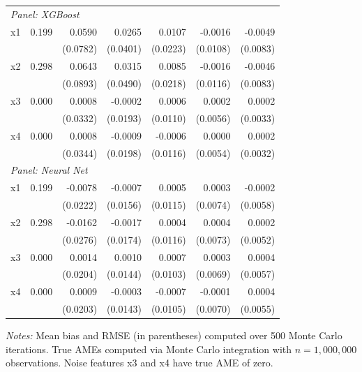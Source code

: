 \documentclass[12pt]{article}
\begin{document}
\begin{table}[htbp]
\begin{threeparttable}
\begin{tabular}{lrrrrrr}
				\multicolumn{7}{l}{\textit{Panel: XGBoost}} \\
				\quad x1 & 0.199 & 0.0590 & 0.0265 & 0.0107 & -0.0016 & -0.0049 \\
				&  & (0.0782) & (0.0401) & (0.0223) & (0.0108) & (0.0083) \\
				\quad x2 & 0.298 & 0.0643 & 0.0315 & 0.0085 & -0.0016 & -0.0046 \\
				&  & (0.0893) & (0.0490) & (0.0218) & (0.0116) & (0.0083) \\
				\quad x3 & 0.000 & 0.0008 & -0.0002 & 0.0006 & 0.0002 & 0.0002 \\
				&  & (0.0332) & (0.0193) & (0.0110) & (0.0056) & (0.0033) \\
				\quad x4 & 0.000 & 0.0008 & -0.0009 & -0.0006 & 0.0000 & 0.0002 \\
				&  & (0.0344) & (0.0198) & (0.0116) & (0.0054) & (0.0032) \\
				\midrule
				\multicolumn{7}{l}{\textit{Panel: Neural Net}} \\
				\quad x1 & 0.199 & -0.0078 & -0.0007 & 0.0005 & 0.0003 & -0.0002 \\
				&  & (0.0222) & (0.0156) & (0.0115) & (0.0074) & (0.0058) \\
				\quad x2 & 0.298 & -0.0162 & -0.0017 & 0.0004 & 0.0004 & 0.0002 \\
				&  & (0.0276) & (0.0174) & (0.0116) & (0.0073) & (0.0052) \\
				\quad x3 & 0.000 & 0.0014 & 0.0010 & 0.0007 & 0.0003 & 0.0004 \\
				&  & (0.0204) & (0.0144) & (0.0103) & (0.0069) & (0.0057) \\
				\quad x4 & 0.000 & 0.0009 & -0.0003 & -0.0007 & -0.0001 & 0.0004 \\
				&  & (0.0203) & (0.0143) & (0.0105) & (0.0070) & (0.0055) \\
				\bottomrule
			\end{tabular}
			\begin{tablenotes}
				\footnotesize
				\item \textit{Notes:} Mean bias and RMSE (in parentheses) computed over 500 Monte Carlo iterations. True AMEs computed via Monte Carlo integration with $n=1{,}000{,}000$ observations. Noise features x3 and x4 have true AME of zero.
			\end{tablenotes}
		\end{threeparttable}
	\end{table}
	
\end{document}
